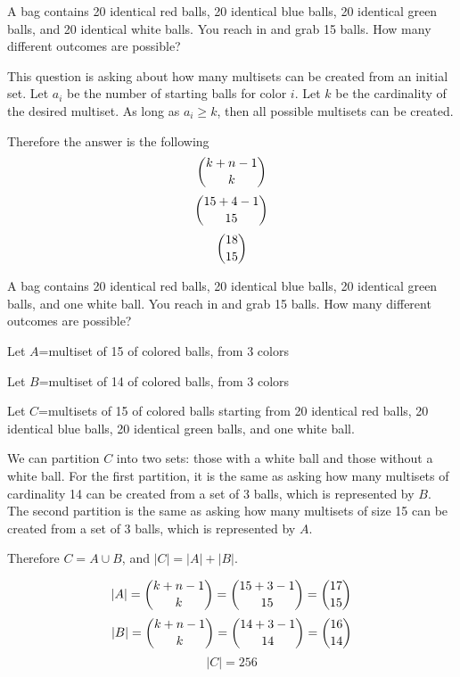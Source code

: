 \documentclass[openany, 11pt]{book}
\begin{document}
\begin{exercise}{}{}
	A bag contains 20 identical red balls, 20 identical blue
	balls, 20 identical green balls, and 20 identical white balls. You reach in
	and grab 15 balls. How many different outcomes are possible?
	\begin{alist}
		\item This question is asking about how many multisets can be created from
		an initial set. Let $a_i$ be the number of starting balls for color $i$.
		Let $k$ be the cardinality of the desired multiset. As long as $a_i\geq k$,
		then all possible multisets can be created.
		\item Therefore the answer is the following
		$$ \dbinom{k+n-1}{k} $$
		$$ \dbinom{15+4-1}{15}$$
		$$ \dbinom{18}{15}$$
	\end{alist}
\end{exercise}

\begin{exercise}{}{}
	A bag contains 20 identical red balls, 20 identical blue balls, 20 identical
	green balls, and one white ball. You reach in and grab 15 balls. How many
	different outcomes are possible?
	\begin{alist}
		\item Let $A$=multiset of 15 of colored balls, from 3 colors
		\item Let $B$=multiset of 14 of colored balls, from 3 colors
		\item Let $C$=multisets of 15 of colored balls starting from 20
		identical red balls, 20 identical blue balls, 20 identical green balls, and
		one white ball.
		\item We can partition $C$ into two sets: those with a white ball and those
		without a white ball. For the first partition, it is the same as asking how
		many multisets of cardinality 14 can be created from a set of 3 balls, which
		is represented by $B$. The second partition is the same as asking how many
		multisets of size 15 can be created from a set of 3 balls, which is
		represented by $A$.
		\item Therefore $C=A \cup B$, and $|C| = |A| + |B|$.
		\item
		$$ |A| = \dbinom{k+n-1}{k} = \dbinom{15+3-1}{15}=\dbinom{17}{15}$$
		$$ |B| = \dbinom{k+n-1}{k} = \dbinom{14+3-1}{14}=\dbinom{16}{14}$$
		$$ |C| = 256 $$
	\end{alist}
\end{exercise}
\end{document}
